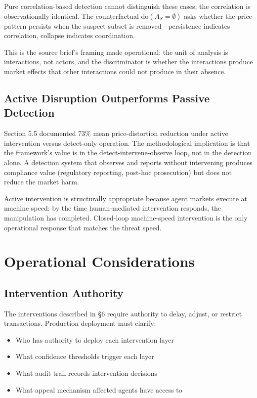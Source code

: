 \documentclass[sigconf,nonacm]{acmart}
\begin{document}
Pure correlation-based detection cannot distinguish these cases;
the correlation is observationally identical. The counterfactual
$\text{do}(A_S = \emptyset)$ asks whether the price pattern
persists when the suspect subset is removed---persistence indicates
correlation, collapse indicates coordination.

This is the source brief's framing made operational: the unit of
analysis is interactions, not actors, and the discriminator is
whether the interactions produce market effects that other
interactions could not produce in their absence.

\subsection{Active Disruption Outperforms Passive Detection}

Section 5.5 documented 73\% mean price-distortion reduction under
active intervention versus detect-only operation. The methodological
implication is that the framework's value is in the
detect-intervene-observe loop, not in the detection alone. A
detection system that observes and reports without intervening
produces compliance value (regulatory reporting, post-hoc
prosecution) but does not reduce the market harm.

Active intervention is structurally appropriate because agent
markets execute at machine speed: by the time human-mediated
intervention responds, the manipulation has completed. Closed-loop
machine-speed intervention is the only operational response that
matches the threat speed.

\section{Operational Considerations}

\subsection{Intervention Authority}

The interventions described in §6 require authority to delay,
adjust, or restrict transactions. Production deployment must
clarify:

\begin{itemize}
  \item Who has authority to deploy each intervention layer
  \item What confidence thresholds trigger each layer
  \item What audit trail records intervention decisions
  \item What appeal mechanism affected agents have access to
\end{itemize}
\end{document}
